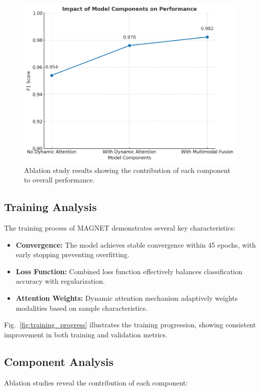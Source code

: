 \documentclass[10pt,conference]{IEEEtran}
\begin{document}
\begin{figure}[!t]
    \centering
    \includegraphics[width=0.9\columnwidth]{figures/fig_ablation_study_en.png}
    \caption{Ablation study results showing the contribution of each component to overall performance.}
    \label{fig:ablation_study}
\end{figure}

\subsection{Training Analysis}
The training process of MAGNET demonstrates several key characteristics:

\begin{itemize}
    \item \textbf{Convergence:} The model achieves stable convergence within 45 epochs, with early stopping preventing overfitting.
    \item \textbf{Loss Function:} Combined loss function effectively balances classification accuracy with regularization.
    \item \textbf{Attention Weights:} Dynamic attention mechanism adaptively weights modalities based on sample characteristics.
\end{itemize}

Fig.~\ref{fig:training_progress} illustrates the training progression, showing consistent improvement in both training and validation metrics.

\subsection{Component Analysis}
Ablation studies reveal the contribution of each component:
\end{document}
